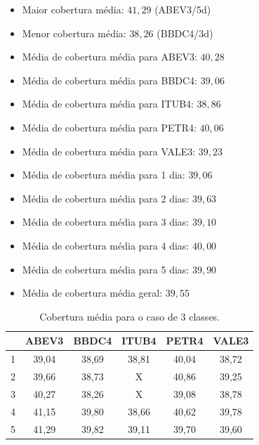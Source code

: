 \documentclass[grad,numbers]{coppe}
\begin{document}
				\begin{itemize}
	 				\item Maior cobertura média: $41,29$ (ABEV3/5d)
	 				\item Menor cobertura média: $38,26$ (BBDC4/3d)
	 				\item Média de cobertura média para ABEV3: $40,28$
	 				\item Média de cobertura média para BBDC4: $39,06$
	 				\item Média de cobertura média para ITUB4: $38,86$
	 				\item Média de cobertura média para PETR4: $40,06$
	 				\item Média de cobertura média para VALE3: $39,23$
	 				\item Média de cobertura média para 1 dia: $39,06$
	 				\item Média de cobertura média para 2 dias: $39,63$
	 				\item Média de cobertura média para 3 dias: $39,10$
	 				\item Média de cobertura média para 4 dias: $40,00$
	 				\item Média de cobertura média para 5 dias: $39,90$
	 				\item Média de cobertura média geral: $39,55$
	 			\end{itemize}
	 			\begin{table}[h]
	 				\caption{Cobertura média para o caso de 3 classes.}
	 				\label{tab:3c_co_analysis}
	 				\centering
	 				{\footnotesize
	 					\begin{tabular}{|c|c|c|c|c|c|}
	 						\hline
	 						\diagbox[linewidth=0.2pt, width=\dimexpr \textwidth/10+2\tabcolsep\relax, height=0.8cm]{Dias}{Ativo}
	 						& ABEV3 & BBDC4 & ITUB4 & PETR4 & VALE3\\
	 						\hline
	 						1 & 39,04 & 38,69 & 38,81 & 40,04 & 38,72 \\
	 						2 & 39,66 & 38,73 & X     & 40,86 & 39,25 \\
	 						3 & 40,27 & 38,26 & X     & 39,08 & 38,78 \\
	 						4 & 41,15 & 39,80 & 38,66 & 40,62 & 39,78 \\
	 						5 & 41,29 & 39,82 & 39,11 & 39,70 & 39,60 \\
	 						\hline
	 				\end{tabular}}
	 			\end{table}
\end{document}
